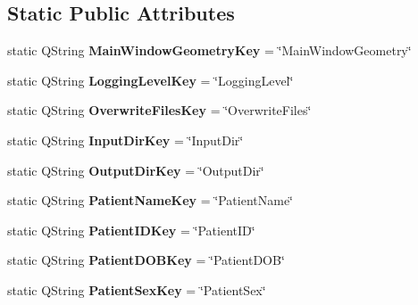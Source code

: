 \subsection*{Static Public Attributes}
\begin{DoxyCompactItemize}
\item 
\mbox{\label{class_settings_af6945ac592f223dfedb6e4fdeced2ad9}} 
static Q\+String {\bfseries Main\+Window\+Geometry\+Key} = \char`\"{}Main\+Window\+Geometry\char`\"{}
\item 
\mbox{\label{class_settings_a175ef5f25c13923b7b3ddfff3bb4221e}} 
static Q\+String {\bfseries Logging\+Level\+Key} = \char`\"{}Logging\+Level\char`\"{}
\item 
\mbox{\label{class_settings_ae1c484d451e8675ea3dc27ec3292a7d0}} 
static Q\+String {\bfseries Overwrite\+Files\+Key} = \char`\"{}Overwrite\+Files\char`\"{}
\item 
\mbox{\label{class_settings_a0a2907802c0b58e529d7e3b5b37616e2}} 
static Q\+String {\bfseries Input\+Dir\+Key} = \char`\"{}Input\+Dir\char`\"{}
\item 
\mbox{\label{class_settings_a5a587a8a4ea1391953b5cfd8e9cc8924}} 
static Q\+String {\bfseries Output\+Dir\+Key} = \char`\"{}Output\+Dir\char`\"{}
\item 
\mbox{\label{class_settings_a4b8f9b74462fd344f6807927d655ff63}} 
static Q\+String {\bfseries Patient\+Name\+Key} = \char`\"{}Patient\+Name\char`\"{}
\item 
\mbox{\label{class_settings_ab97c9e2185f216041271820d6623f024}} 
static Q\+String {\bfseries Patient\+I\+D\+Key} = \char`\"{}Patient\+ID\char`\"{}
\item 
\mbox{\label{class_settings_a440dffe06be1b6ee9d93d040147622df}} 
static Q\+String {\bfseries Patient\+D\+O\+B\+Key} = \char`\"{}Patient\+D\+OB\char`\"{}
\item 
\mbox{\label{class_settings_a3aa6f82ed9e19607325b2b840aa45514}} 
static Q\+String {\bfseries Patient\+Sex\+Key} = \char`\"{}Patient\+Sex\char`\"{}

\end{DoxyCompactItemize}
